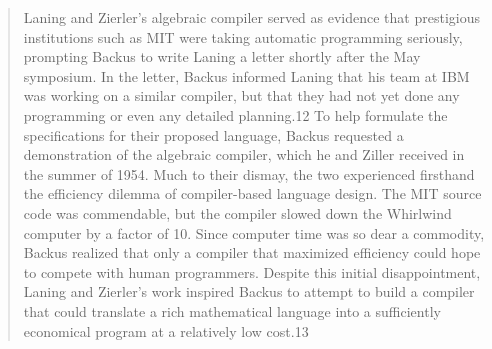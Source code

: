 \begin{quotation}
	Laning and Zierler's algebraic compiler served as evidence that prestigious
	institutions such as MIT were taking automatic programming
	seriously, prompting
	Backus to write Laning a letter shortly after the May symposium.
	In the letter,
	Backus informed Laning that his team at IBM was working on a
	similar compiler,
	but that they had not yet done any programming or even any
	detailed planning.12
	To help formulate the specifications for their proposed language, Backus
	requested a demonstration of the algebraic compiler, which he and Ziller
	received in the summer of 1954. Much to their dismay, the two
	experienced firsthand the efficiency dilemma of compiler-based
	language design. The MIT
	source code was commendable, but the compiler slowed down the Whirlwind
	computer by a factor of 10. Since computer time was so dear a
	commodity, Backus
	realized that only a compiler that maximized efficiency could
	hope to compete
	with human programmers. Despite this initial disappointment, Laning and
	Zierler's work inspired Backus to attempt to build a compiler that could
	translate a rich mathematical language into a sufficiently
	economical program
	at a relatively low cost.13
	\cite{grace_hopper_and_the_invention_of_the_information_age_2009}
\end{quotation}
